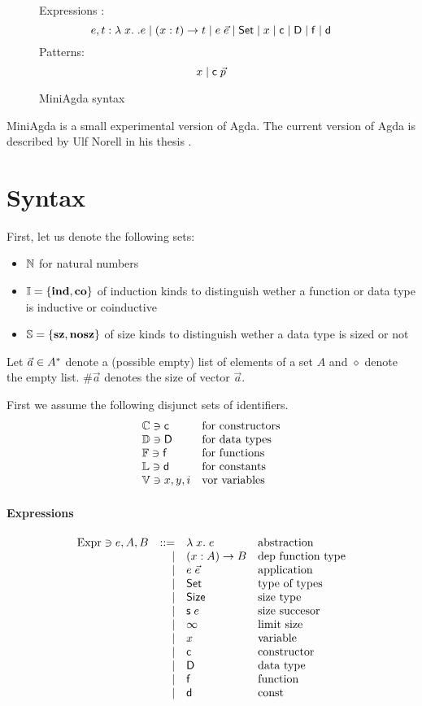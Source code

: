 \begin{figure}[p]
\caption{MiniAgda syntax}
Expressions : \[e,t :  \lambda\; x .\; . e \mid ( x : t ) \rightarrow{t} \mid e \; \vec{e} \mid  \mathsf{Set} \mid x \mid \mathsf{c} \mid \mathsf{D} \mid \mathsf{f} \mid \mathsf{d}\]
Patterns: \[ x  \mid \mathsf{c} \; \vec{p} \]
\end{figure}

MiniAgda is a small experimental version of Agda.
The current version of Agda is described by Ulf Norell in his thesis \cite{norell:thesis}.



\section{Syntax}
First, let us denote the following sets:
\begin{itemize}
\item
$ \mathbb{N} $ for natural numbers
\item
$ \mathbb{I} = \{ \mathbf{ind} , \mathbf{co} \} $ of induction kinds to distinguish wether a function or data type is 
inductive or coinductive  
\item
$ \mathbb{S} = \{ \mathbf{sz}, \mathbf{nosz} \} $ of size kinds to distinguish wether a data type is sized or not
\end{itemize}

Let $\vec{a} \in {A}^{\ast} $ denote a (possible empty) list of elements of a set $A$
and $\diamond$ denote the empty list. $\#\vec{a}$ denotes the size of vector $\vec{a}$.

First we assume the following disjunct sets of identifiers.
\[
\begin{array}{ll}
\mathbb{C} \ni \mathsf{c} & \mbox{for constructors}\\
\mathbb{D} \ni \mathsf{D} & \mbox{for data types}\\
\mathbb{F} \ni \mathsf{f} & \mbox{for functions}\\
\mathbb{L} \ni \mathsf{d} & \mbox{for constants}\\
\mathbb{V} \ni x,y,i & \mbox{vor variables}
\end{array}
\]

\paragraph*{Expressions}
\[
\begin{array}{lrll}
\mathrm{Expr} \ni e,A,B & ::= & \lambda\; x .\;{e} & \mbox{abstraction}\\
& \mid & ( x : A ) \rightarrow{B} & \mbox{dep function type}\\
& \mid & e \; \vec{e} & \mbox{application}\\
& \mid & \mathsf{Set} & \mbox{type of types}\\
& \mid & \mathsf{Size} & \mbox{size type} \\
& \mid & \mathsf{s}\; e  & \mbox{size succesor}\\ 
& \mid & \infty & \mbox{limit size}\\
& \mid & x & \mbox{variable}\\
& \mid & \mathsf{c} & \mbox{constructor}\\
& \mid & \mathsf{D} & \mbox{data type}\\
& \mid & \mathsf{f} & \mbox{function}\\
& \mid & \mathsf{d} & \mbox{const}
\end{array}
\]

